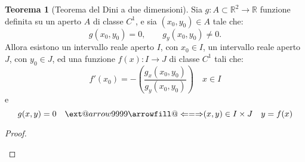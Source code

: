 \documentclass[leqno]{article}
\makeatletter
\newcommand\xLeftrightarrow[2][]{%
	\ext@arrow 9999{\Longleftrightarrowfill@}{#1}{#2}}
\newcommand\Longleftrightarrowfill@{%
	\arrowfill@\Leftarrow\Relbar\Rightarrow}
\theoremstyle{definition}
\numberwithin{equation}{section}
\newtheorem{theorem}{Teorema}[section]
\theoremstyle{remark}
\makeatother
\begin{document}
	\begin{theorem}[Teorema del Dini a due dimensioni]
		Sia $g:A\subset \mathbb{R}^2 \rightarrow \mathbb{R}$ funzione definita su un aperto $A$ di classe $C^1$, e sia $(x_{0},y_{0})\in A$ tale che: 
		\begin{equation}
			g(x_{0},y_{0})=0,\qquad g_{y}(x_{0},y_{0})\neq 0.
		\end{equation}
		Allora esistono un intervallo reale aperto $I$, con $x_0 \in I$, un intervallo reale aperto $J$, con $y_0 \in J$, ed una funzione $f(x): I \rightarrow J$ di classe $C^1$ tali che:
		\begin{equation}
			f'(x_{0})=-\left({\frac {g_{x}(x_{0},y_{0})}{g_{y}(x_{0},y_{0})}}\right) \quad x\in I
		\end{equation}
		e 
		\begin{equation}
			g(x,y)=0 \quad \xLeftrightarrow{\text{$(x,y)\in I\times J$}} \quad y=f(x)
		\end{equation}
		\begin{proof}
			
			\begin{description}
				

\end{description}
\end{proof}
\end{theorem}
\end{document}
